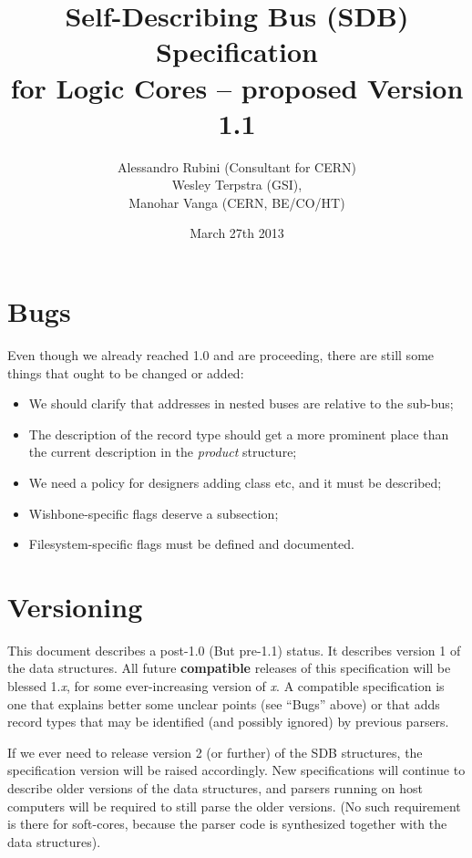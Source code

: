 \documentclass[a4paper, 12pt]{article}
\title{Self-Describing Bus (SDB) Specification\\
for Logic Cores -- proposed Version 1.1}
\author{Alessandro Rubini (Consultant for CERN)\\
Wesley Terpstra (GSI),\\
Manohar Vanga (CERN, BE/CO/HT)}
\date{March 27th 2013}
\begin{document}
\maketitle

\tableofcontents
\listoftables

\pagebreak

\section*{Bugs}

Even though we already reached 1.0 and are proceeding, there are still some
things that ought to be changed or added:

\begin{itemize}
\item We should clarify that  addresses in nested buses are relative to the sub-bus;
\item The description of the record type should get a more prominent place than the
  current description in the \textit{product} structure;
\item We need a policy for designers adding class etc, and it must be described;
\item Wishbone-specific flags deserve a subsection;
\item Filesystem-specific flags must be defined and documented.
\end{itemize}

\section*{Versioning}

This document describes a post-1.0 (But pre-1.1) status. It describes version 1 of the data
structures. All future \textbf{compatible} releases of this
specification will be blessed 1.\textit{x}, for some ever-increasing
version of \textit{x}.  A compatible specification is one that
explains better some unclear points (see ``Bugs'' above) or that adds
record types that may be identified (and possibly ignored) by previous
parsers.

If we ever need to release version 2 (or further) of the SDB
structures, the specification version will be raised accordingly. New
specifications will continue to describe older versions of the data
structures, and parsers running on host computers will be required to
still parse the older versions.  (No such requirement is there for
soft-cores, because the parser code is synthesized together with the data
structures).
\end{document}
